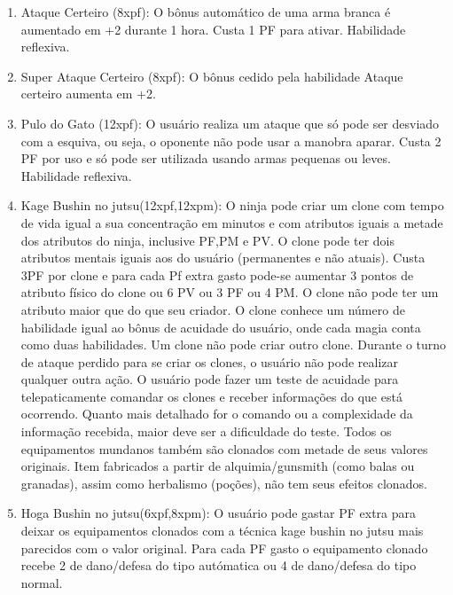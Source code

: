 \begin{enumerate}
	\item Ataque Certeiro (8xpf): O bônus automático de uma arma branca é aumentado em +2 durante 1 hora. Custa 1 PF para ativar. Habilidade reflexiva.
	
	\item Super Ataque Certeiro (8xpf): O bônus cedido pela habilidade Ataque certeiro aumenta em +2. 
	
	\item Pulo do Gato (12xpf): O usuário realiza um ataque que só pode ser desviado com a esquiva, ou seja, o oponente não pode usar a manobra aparar. Custa 2 PF por uso e só pode ser utilizada usando armas pequenas ou leves. Habilidade reflexiva.


	\item Kage Bushin no jutsu(12xpf,12xpm): O ninja pode criar um clone com tempo de vida igual a sua concentração em minutos e com atributos iguais a metade dos atributos do ninja, inclusive PF,PM e PV. O clone pode ter dois atributos mentais iguais aos do usuário (permanentes e não atuais). Custa 3PF por clone e para cada Pf extra gasto pode-se aumentar 3 pontos de atributo físico do clone ou 6 PV ou 3 PF ou 4 PM. O clone não pode ter um atributo maior que do que seu criador. O clone conhece um número de habilidade igual ao bônus de acuidade do usuário, onde cada magia conta como duas habilidades. Um clone não pode criar outro clone. Durante o turno de ataque perdido para se criar os clones, o usuário não pode realizar qualquer outra ação. O usuário pode fazer um teste de acuidade para telepaticamente comandar os clones e receber informações do que está ocorrendo. Quanto mais detalhado for o comando ou a complexidade da informação recebida, maior deve ser a dificuldade do teste. Todos os equipamentos mundanos também são clonados com metade de seus valores originais. Item fabricados a partir de alquimia/gunsmith (como balas ou granadas), assim como herbalismo (poções), não tem seus efeitos clonados.
	
	\item Hoga Bushin no jutsu(6xpf,8xpm): O usuário pode gastar PF extra para deixar os equipamentos clonados com a técnica kage bushin no jutsu mais parecidos com o valor original. Para cada PF gasto o equipamento clonado recebe 2 de dano/defesa do tipo autómatica ou 4 de dano/defesa do tipo normal.	
	

\end{enumerate}
